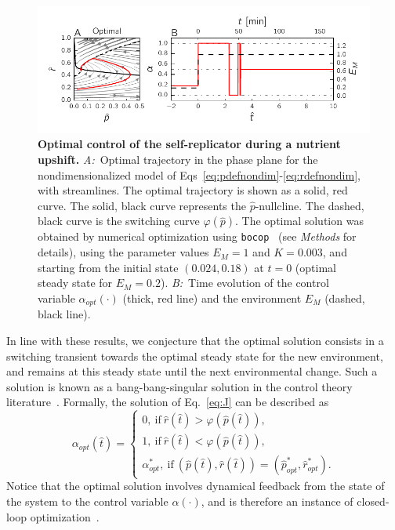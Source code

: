 \begin{figure}[tb]
\centering
\includegraphics[clip,trim={0.4cm 0.5cm 0.54cm 0.45cm}]{./Fig/Fig4}
\caption{
\textbf{Optimal control of the self-replicator during a nutrient upshift.}
\textit{A:}~Optimal trajectory in the phase plane for the nondimensionalized model of Eqs~\ref{eq:pdefnondim}-\ref{eq:rdefnondim}, with streamlines. The optimal trajectory is shown as a solid, red curve.
The solid, black curve represents the $\hat{p}$-nullcline.
The dashed, black curve is the switching curve $\varphi(\hat{p})$.
The optimal solution was obtained by numerical optimization using \texttt{bocop}~\cite{bonnans_bocop_2012} (see \textit{Methods} for details), using the parameter values $E_M=1$ and $K=0.003$, and starting from the initial state $(0.024,0.18)$ at $t=0$ (optimal steady state for $E_M=0.2$).
\textit{B:}~Time evolution of the control variable $\alpha_{opt}(\cdot)$ (thick, red line) and the environment $E_M$ (dashed, black line).
}
\label{fig:optimalcontrol}
\end{figure}

In line with these results, we conjecture that the optimal solution consists in a switching transient towards the optimal steady state for the new environment, and remains at this steady state until the next environmental change.
Such a solution is known as a bang-bang-singular solution in the control theory literature~\cite{stengel_optimal_1994}.
Formally, the solution of Eq.~\ref{eq:J} can be described as
\begin{equation}
\label{eq:optcontrol}
\alpha_{opt}(\hat{t})=
\begin{cases}
0, \ \textrm{if} \ \hat{r}(\hat{t}) > \varphi(\hat{p}(\hat{t})),\\
1, \ \textrm{if} \ \hat{r}(\hat{t}) < \varphi(\hat{p}(\hat{t})), \\
\alpha^*_{opt}, \ \textrm{if} \ (\hat{p}(\hat{t}),\hat{r}(\hat{t}))=(\hat{p}_{opt}^*,\hat{r}_{opt}^*).
\end{cases}
\end{equation}
Notice that the optimal solution involves dynamical feedback from the state of the system to the control variable $\alpha(\cdot)$, and is therefore an instance of closed-loop optimization~\cite{stengel_optimal_1994}.

